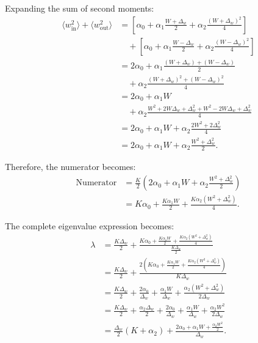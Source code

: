 \documentclass[a4paper,pre,superscriptaddress,floatfix,nofootinbib,twocolumn]{revtex4-1}
\begin{document}
Expanding the sum of second moments:
\begin{align*}
\langle w^2_\text{in} \rangle + \langle w^2_\text{out} \rangle &= \left[\alpha_0 + \alpha_1 \frac{W + \Delta_{w}}{2} + \alpha_2 \frac{(W + \Delta_{w})^2}{4}\right]\\
&\quad + \left[\alpha_0 + \alpha_1 \frac{W - \Delta_{w}}{2} + \alpha_2 \frac{(W - \Delta_{w})^2}{4}\right]\\
&= 2\alpha_0 + \alpha_1 \frac{(W + \Delta_{w}) + (W - \Delta_{w})}{2}\\
&\quad + \alpha_2 \frac{(W + \Delta_{w})^2 + (W - \Delta_{w})^2}{4}\\
&= 2\alpha_0 + \alpha_1 W \\
&\quad + \alpha_2 \frac{W^2 + 2W\Delta_{w} + \Delta_{w}^2 + W^2 - 2W\Delta_{w} + \Delta_{w}^2}{4}\\
&= 2\alpha_0 + \alpha_1 W + \alpha_2 \frac{2W^2 + 2\Delta_{w}^2}{4}\\
&= 2\alpha_0 + \alpha_1 W + \alpha_2 \frac{W^2 + \Delta_{w}^2}{2}.
\end{align*}

Therefore, the numerator becomes:
\begin{align*}
\text{Numerator} &= \frac{K}{2} \left(2\alpha_0 + \alpha_1 W + \alpha_2 \frac{W^2 + \Delta_{w}^2}{2}\right)\\
&= K\alpha_0 + \frac{K\alpha_1 W}{2} + \frac{K\alpha_2(W^2 + \Delta_{w}^2)}{4}.
\end{align*}

The complete eigenvalue expression becomes:
\begin{align*}
\lambda &= \frac{K\Delta_{w}}{2} + \frac{K\alpha_0 + \frac{K\alpha_1 W}{2} + \frac{K\alpha_2(W^2 + \Delta_{w}^2)}{4}}{\frac{K\Delta_{w}}{2}}\\
&= \frac{K\Delta_{w}}{2} + \frac{2\left(K\alpha_0 + \frac{K\alpha_1 W}{2} + \frac{K\alpha_2(W^2 + \Delta_{w}^2)}{4}\right)}{K\Delta_{w}}\\
&= \frac{K\Delta_{w}}{2} + \frac{2\alpha_0}{\Delta_{w}} + \frac{\alpha_1 W}{\Delta_{w}} + \frac{\alpha_2(W^2 + \Delta_{w}^2)}{2\Delta_{w}}\\
&= \frac{K\Delta_{w}}{2} + \frac{\alpha_2\Delta_{w}}{2} + \frac{2\alpha_0}{\Delta_{w}} + \frac{\alpha_1 W}{\Delta_{w}} + \frac{\alpha_2W^2}{2\Delta_{w}}\\
&= \frac{\Delta_{w}}{2}(K + \alpha_2) + \frac{2\alpha_0 + \alpha_1 W + \frac{\alpha_2W^2}{2}}{\Delta_{w}}.
\end{align*}
\end{document}
